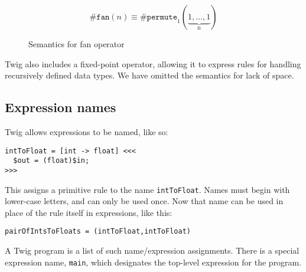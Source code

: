 \begin{figure}[ht]
\[
\mathtt{\#fan}(n) \equiv \mathtt{\#permute}_1(\underbrace{1,\ldots,1}_\text{n})
\]
\caption{Semantics for fan operator}
\label{fig:fan}
\end{figure}


Twig also includes a fixed-point operator, allowing it to express rules for handling recursively defined data types. We have omitted the semantics for lack of space.


\subsection{Expression names}
\label{section:names}

Twig allows expressions to be named, like so:

\begin{verbatim}
intToFloat = [int -> float] <<<
  $out = (float)$in;
>>>
\end{verbatim}

This assigns a primitive rule to the name \texttt{intToFloat}. Names must begin with lower-case letters, and can only be used once. Now that name can be used in place of the rule itself in expressions, like this:

\begin{verbatim}
pairOfIntsToFloats = (intToFloat,intToFloat)
\end{verbatim}

A Twig program is a list of such name/expression assignments. There is a special expression name, \texttt{main}, which designates the top-level expression for the program.

% 
% 
